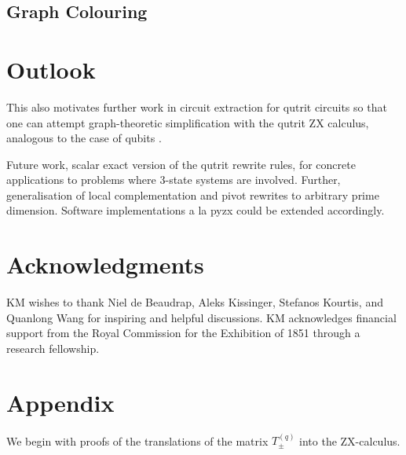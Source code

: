 \documentclass[submission,copyright,creativecommons]{eptcs}
\begin{document}
\subsection{Graph Colouring}


\section{Outlook}


This also motivates further work in circuit extraction for qutrit circuits so that one can attempt graph-theoretic simplification with the qutrit ZX calculus, analogous to the case of qubits \cite{graph_theoretic_simplification,backens2020again}.

Future work, scalar exact version of the qutrit rewrite rules,
for concrete applications to problems where $3$-state systems are involved.
Further,
generalisation of local complementation and pivot rewrites to arbitrary prime dimension.
Software implementations a la pyzx could be extended accordingly.

\section{Acknowledgments}
KM wishes to thank Niel de Beaudrap, Aleks Kissinger, Stefanos Kourtis, and Quanlong Wang for inspiring and helpful discussions.
KM acknowledges financial support from the Royal Commission for the Exhibition of 1851 through a research fellowship.







\appendix

\section{Appendix}

We begin with proofs of the translations of the matrix $T_{\pm}^{(q)}$ into the ZX-calculus. 
\end{document}
